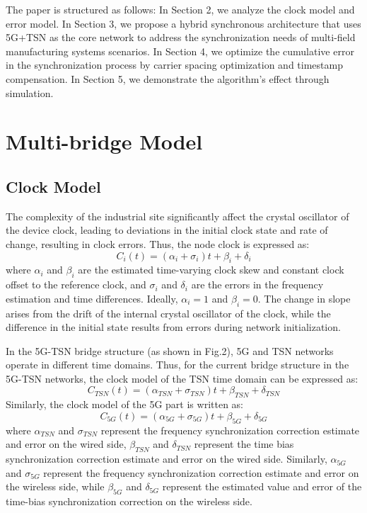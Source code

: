 \documentclass[english]{cccconf}
\begin{document}
The paper is structured as follows: In Section 2, we analyze the clock model and error model. In Section 3, we propose a hybrid synchronous architecture that uses 5G+TSN as the core network to address the synchronization needs of multi-field manufacturing systems scenarios. In Section 4, we optimize the cumulative error in the synchronization process by carrier spacing optimization and timestamp compensation. In Section 5, we demonstrate the algorithm's effect through simulation.

\section{ Multi-bridge Model}

\subsection{Clock Model}
The complexity of the industrial site significantly affect the crystal oscillator of the device clock, leading to deviations in the initial clock state and rate of change, resulting in clock errors. Thus, the node clock is expressed as:
\begin{equation}
	C_i(t) = (\alpha _i+\sigma_i)t + \beta _i +\delta_i
\end{equation}
where $\alpha_i$ and $\beta_i$ are the estimated time-varying clock skew and constant clock offset to the reference clock, and $\sigma_i$ and $\delta_i$ are the errors in the frequency estimation and time differences. Ideally, $\alpha_i = 1$ and $\beta_i = 0$. The change in slope arises from the drift of the internal crystal oscillator of the clock, while the difference in the initial state results from errors during network initialization.

In the 5G-TSN bridge structure (as shown in Fig.2), 5G and TSN networks operate in different time domains. Thus, for the current bridge structure in  the 5G-TSN networks, the clock model of the TSN time domain can be expressed as:
\begin{equation}
	C_{TSN}(t) = (\alpha_{TSN}+\sigma_{TSN})t + \beta _{TSN} +\delta_{TSN}
\end{equation}
 Similarly, the clock model of the 5G part is written as:
 \begin{equation}
 	C_{5G}(t) = (\alpha_{5G}+\sigma_{5G})t + \beta _{5G} +\delta_{5G}
 \end{equation}
where $\alpha_{TSN}$ and $\sigma_{TSN}$ represent the frequency synchronization correction estimate and error on the wired side, $\beta_{TSN}$ and $\delta_{TSN}$ represent the time bias synchronization correction estimate and error on the wired side. Similarly, $\alpha_{5G}$ and $\sigma_{5G}$ represent the frequency synchronization correction estimate and error on the wireless side, while $\beta_{5G}$ and $\delta_{5G}$ represent the estimated value and error of the time-bias synchronization correction on the wireless side. 
\end{document}
